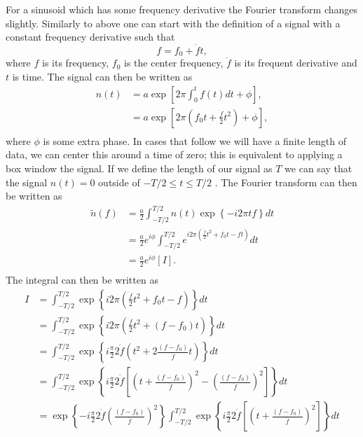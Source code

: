For a sinusoid which has some frequency derivative the Fourier transform changes slightly. 
Similarly to above one can start with the definition of a signal with a constant frequency derivative such that
\begin{equation}
 f = f_0 + \dot{f} t ,
\end{equation}
where $f$ is its frequency, $f_0$ is the center frequency, $\dot{f}$ is its frequent derivative and $t$ is time.
The signal can then be written as
\begin{equation}
\begin{split}
n(t) &= a \exp{\left[2\pi \int_0^t f(t) dt + \phi\right]}, \\
&= a \exp{\left[2\pi (f_0 t +  \frac{\dot{f}}{2} t^2)  + \phi\right]}, \\
\label{app1:waveform}
\end{split}
\end{equation}
where $\phi$ is some extra phase.
In cases that follow we will have a finite length of data, we can center this around a time of zero; this is equivalent to applying a box window the signal.
If we define the length of our signal as $T$ we can say that the signal $n(t) = 0$ outside of $-T/2 \leq t \leq T/2$ \citep{misaridis2005UseModulated}.
The Fourier transform can then be written as
\begin{equation}
\begin{split}
\tilde{n}(f) &= \frac{a}{2}  \int_{-T/2}^{T/2} n(t) \exp{\left\{ -i 2 \pi t f\right\}} dt \\
&= \frac{a}{2} e^{i\phi} \int_{-T/2}^{T/2} e^{i 2 \pi \left(\frac{\dot{f}}{2} t^2 + f_{0}t - ft \right)} dt  \\
&= \frac{a}{2} e^{i\phi} \left[  I  \right]. \\
\end{split}
\end{equation}
The integral can then be written as
\begin{equation}
\begin{split}
I &= \int_{-T/2}^{T/2} \exp{\left\{i 2 \pi \left(\frac{\dot{f}}{2} t^2 + f_{0}t - f \right) \right\}} dt \\
&= \int_{-T/2}^{T/2} \exp{\left\{ i 2 \pi\left(\frac{\dot{f}}{2} t^2 + (f - f_{0})t \right) \right\}} dt \\
& = \int_{-T/2}^{T/2} \exp{\left\{i \frac{\pi}{2} 2 \dot{f} \left(t^2 + 2\frac{(f - f_0)}{\dot{f}}t \right)\right\}} dt \\
& = \int_{-T/2}^{T/2} \exp{\left\{i \frac{\pi}{2} 2 \dot{f} \left[\left(t + \frac{(f - f_0)}{\dot{f}} \right)^2 - \left(\frac{(f - f_0)}{\dot{f}}\right)^2 \right]\right\}} dt \\
& = \exp{\left\{  - i \frac{\pi}{2} 2 \dot{f} \left(\frac{(f - f_0)}{\dot{f}}\right)^2 \right\}}\int_{-T/2}^{T/2} \exp{\left\{i \frac{\pi}{2} 2 \dot{f} \left[\left(t + \frac{(f - f_0)}{\dot{f}} \right)^2 \right]\right\}} dt \\
\end{split}
\end{equation}
